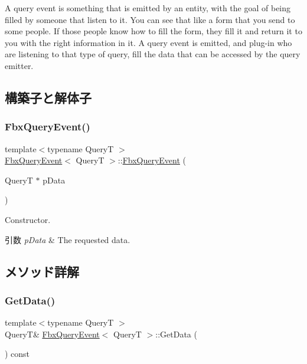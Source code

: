 A query event is something that is emitted by an entity, with the goal of being filled by someone that listen to it. You can see that like a form that you send to some people. If those people know how to fill the form, they fill it and return it to you with the right information in it. A query event is emitted, and plug-\/in who are listening to that type of query, fill the data that can be accessed by the query emitter. 

\subsection{構築子と解体子}
\mbox{\label{class_fbx_query_event_ac0f4e691d9190901d1b55cea64653055}} 
\subsubsection{\texorpdfstring{Fbx\+Query\+Event()}{FbxQueryEvent()}}
{\footnotesize\ttfamily template$<$typename QueryT $>$ \\
\hyperlink{class_fbx_query_event}{Fbx\+Query\+Event}$<$ QueryT $>$\+::\hyperlink{class_fbx_query_event}{Fbx\+Query\+Event} (\begin{DoxyParamCaption}\item[{QueryT $\ast$}]{p\+Data }\end{DoxyParamCaption})\hspace{0.3cm}{\ttfamily [explicit]}}

Constructor. 
\begin{DoxyParams}{引数}
{\em p\+Data} & The requested data. \\
\hline
\end{DoxyParams}


\subsection{メソッド詳解}
\mbox{\label{class_fbx_query_event_aff8c93540fbd84ec48c8fed06593e4b4}} 
\subsubsection{\texorpdfstring{Get\+Data()}{GetData()}}
{\footnotesize\ttfamily template$<$typename QueryT $>$ \\
QueryT\& \hyperlink{class_fbx_query_event}{Fbx\+Query\+Event}$<$ QueryT $>$\+::Get\+Data (\begin{DoxyParamCaption}{ }\end{DoxyParamCaption}) const}

